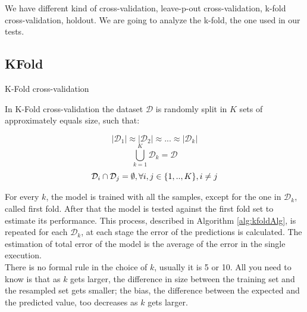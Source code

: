 We have different kind of cross-validation, leave-p-out cross-validation, k-fold cross-validation, holdout. We are going to analyze the k-fold, the one used in our tests.





\subsection{KFold}

\begin{algorithm}
	\caption{K-Fold cross-validation}\label{alg:kfoldAlg}
	\begin{algorithmic}[1]
		 
		
		
		\EndFor
		
	\end{algorithmic}
\end{algorithm}

In K-Fold cross-validation the dataset $\mathcal{D}$ is randomly split in $K$ sets of approximately equals size, such that: \cite{ghojogh2019theory} \cite{kuhn2013applied}

\[|\mathcal{D}_1| \approx |\mathcal{D}_2| \approx ... \approx |\mathcal{D}_k|
\]
\[
\bigcup_{k=1}^{K} \mathcal{D}_{k} = \mathcal{D}
\]
\[
 \mathcal{D}_i \cap \mathcal{D}_j = \emptyset, \space \forall i,j \in \{1, .., K \}, i \neq j
\]

For every $k$, the model is trained with all the samples, except for the one in $\mathcal{D}_k$, called first fold. After that the model is tested against the first fold set to estimate its performance. This process, described in Algorithm \ref{alg:kfoldAlg}, is repeated for each $\mathcal{D}_k$, at each stage the error of the predictions is calculated. The estimation of total error of the model is the average of the error in the single execution.\\

There is no formal rule in the choice of $k$, usually it is 5 or 10. All you need to know is that as $k$ gets larger, the difference in size between the training set and the resampled set gets smaller; the bias, the difference between the expected and the predicted value, too decreases as $k$ gets larger.

